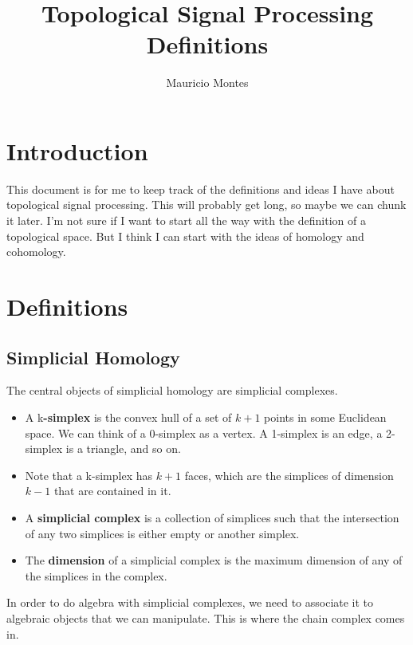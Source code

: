 \documentclass[12pt]{article}
\author{Mauricio Montes}
\title{Topological Signal Processing Definitions}
\begin{document}
\maketitle

\section{Introduction}

This document is for me to keep track of the definitions and ideas I have about topological signal
processing. This will probably get long, so maybe we can chunk it later. I'm not sure if I want to
start all the way with the definition of a topological space. But I think I can start with the ideas
of homology and cohomology. 

\section{Definitions}

\subsection{Simplicial Homology}

The central objects of simplicial homology are simplicial complexes.

\begin{itemize}

\item A k\textbf{-simplex} is the convex hull of a set of $k+1$ points in some Euclidean space. We can think of a 0-simplex as a
  vertex. A 1-simplex is an edge, a 2-simplex is a triangle, and so on. 

\item Note that a k-simplex has $k+1$ faces, which are the simplices of dimension $k-1$ that are
  contained in it.

\item A \textbf{simplicial complex} is a collection of simplices such that the intersection of any two simplices is either empty or
another simplex.

\item The \textbf{dimension} of a simplicial complex is the maximum dimension of any of the simplices in the complex. 

\end{itemize}

In order to do algebra with simplicial complexes, we need to associate it to algebraic objects that
we can manipulate. This is where the chain complex comes in.
\end{document}
